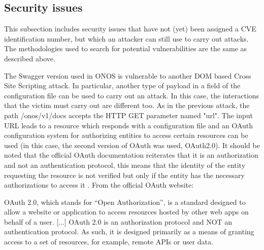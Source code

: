 \documentclass[a4paper,10pt]{memoir}
\begin{document}
\subsection{Security issues}
This subsection includes security issues that have not (yet) been assigned a CVE identification number, but which an attacker can still use to carry out attacks. The methodologies used to search for potential vulnerabilities are the same as described above.

The Swagger version used in ONOS is vulnerable to another DOM based Cross Site Scripting attack. In particular, another type of payload in a field of the configuration file can be used to carry out an attack. In this case, the interactions that the victim must carry out are different too. As in the previous attack, the path /onos/v1/docs accepts the HTTP GET parameter named "url". The input URL leads to a resource which responds with a configuration file and an OAuth configuration system for authorizing entities to access certain resources can be used (in this case, the second version of OAuth was used, OAuth2.0). It should be noted that the official OAuth documentation reiterates that it is an authorization and not an authentication protocol, this means that the identity of the entity requesting the resource is not verified but only if the entity has the necessary authorizations to access it \cite{oauth}. From the official OAuth website:
\begin{quoting}[font=itshape, begintext={"}, endtext={"}]
OAuth 2.0, which stands for “Open Authorization”, is a standard designed to allow a website or application to access resources hosted by other web apps on behalf of a user. [...]
OAuth 2.0 is an authorization protocol and NOT an authentication protocol. As such, it is designed primarily as a means of granting access to a set of resources, for example, remote APIs or user data.
\end{quoting}
\end{document}
